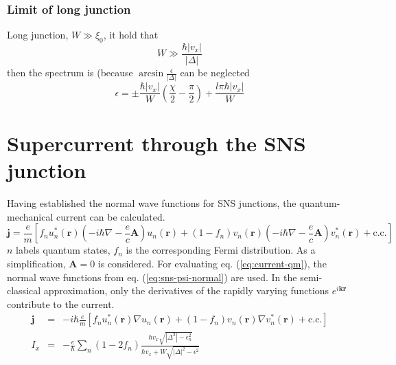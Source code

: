 \subsubsection*{Limit of long junction}

Long junction, $W \gg \xi_0$, it hold that 
\begin{equation}
W \gg \frac{\hbar |v_x|}{|\Delta|} 
\end{equation} 
then the spectrum is (because $\arcsin \frac{\epsilon}{|\Delta|}$ can be neglected
\begin{equation}
\epsilon = \pm \frac{\hbar |v_x|}{W}\left(\frac{\chi}{2} - \frac{\pi}{2} \right) + \frac{l \pi \hbar |v_x|}{W} 
\end{equation}

\section{Supercurrent through the SNS junction}
Having established the normal wave functions for SNS junctions, the quantum-mechanical current can be calculated.
\begin{equation}
\mathbf{j} = \frac{e}{m} \left[ f_n u_n^* \left( \mathbf{r} \right) \left( - i \hbar \nabla - \frac{e}{c} \mathbf{A} \right) u_n\left( \mathbf{r} \right) + \left(1-f_n\right) v_n\left( \mathbf{r} \right) \left( -i \hbar \nabla - \frac{e}{c} \mathbf{A} \right) v_n^*\left( \mathbf{r} \right) + \text{c.c.} \right] \label{eq:current-qm}
\end{equation}
$n$ labels quantum states, $f_n$ is the corresponding Fermi distribution.
As a simplification, $\mathbf{A} = 0$ is considered. For evaluating eq. (\ref{eq:current-qm}), the normal wave functions from eq. (\ref{eq:sns-psi-normal}) are used. In the semi-classical approximation, only the derivatives of the rapidly varying functions $e^{i\mathbf{k r}}$ contribute to the current.
\begin{eqnarray}
\mathbf{j} &=& - i \hbar  \frac{e}{m} \left[ f_n u_n^* \left( \mathbf{r} \right) \nabla  u_n \left( \mathbf{r} \right) + \left(1-f_n\right) v_n\left( \mathbf{r} \right) \nabla v_n^*\left( \mathbf{r} \right) + \text{c.c.} \right]\\
I_x &=& - \frac{e}{\hbar} \sum_n \left(1- 2 f_n \right) \frac{\hbar v_x \sqrt{|\Delta^2| - \epsilon_n^2}}{\hbar v_x + W \sqrt{|\Delta|^2 -\epsilon^2}}
\end{eqnarray}

